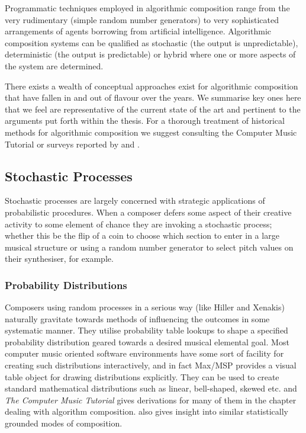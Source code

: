 Programmatic techniques employed in algorithmic composition range from the very rudimentary (simple random number generators) to very sophisticated arrangements of agents borrowing from artificial intelligence. Algorithmic composition systems can be qualified as stochastic (the output is unpredictable), deterministic (the output is predictable) or hybrid where one or more aspects of the system are determined.

There exists a wealth of conceptual approaches exist for algorithmic composition that have fallen in and out of flavour over the years. We summarise key ones here that we feel are representative of the current state of the art and pertinent to the arguments put forth within the thesis. For a thorough treatment of historical methods for algorithmic composition we suggest consulting the Computer Music Tutorial \citep{Roads1996} or surveys reported by \cite{Fernandez2013} and \cite{Papadopoulos199}.

\subsection{Stochastic Processes}

Stochastic processes are largely concerned with strategic applications of probabilistic procedures. When a composer defers some aspect of their creative activity to some element of chance they are invoking a stochastic process; whether this be the flip of a coin to choose which section to enter in a large musical structure or using a random number generator to select pitch values on their synthesiser, for example.

\subsubsection{Probability Distributions}

Composers using random processes in a serious way (like Hiller and Xenakis) naturally gravitate towards methods of influencing the outcomes in some systematic manner. They  utilise probability table lookups to shape a specified probability distribution geared towards a desired musical elemental goal. Most computer music oriented software environments have some sort of facility for creating such distributions interactively, and in fact Max/MSP provides a visual table object for drawing distributions explicitly. They can be used to create standard mathematical distributions such as linear, bell-shaped, skewed etc. and \textit{The Computer Music Tutorial} \citep{Roads1996} gives derivations for many of them in the chapter dealing with algorithm composition. \cite{Ames1990a} also gives insight into similar statistically grounded modes of composition.

